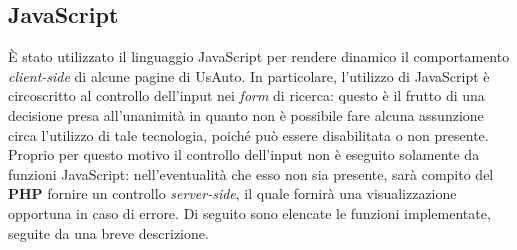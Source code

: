 	\subsection{JavaScript}
	\par \`E stato utilizzato il linguaggio JavaScript per rendere dinamico il comportamento \textit{client-side} di alcune pagine di UsAuto. In particolare, l'utilizzo di JavaScript è circoscritto al controllo dell'input nei \textit{form} di ricerca: questo è il frutto di una decisione presa all'unanimità in quanto non è possibile fare alcuna assunzione circa l'utilizzo di tale tecnologia, poiché può essere disabilitata o non presente. Proprio per questo motivo il controllo dell'input non è eseguito solamente da funzioni JavaScript: nell'eventualità che esso non sia presente, sarà compito del \textbf{PHP} fornire un controllo \textit{server-side}, il quale fornirà una visualizzazione opportuna in caso di errore. Di seguito sono elencate le funzioni implementate, seguite da una breve descrizione.
	\oniontable
